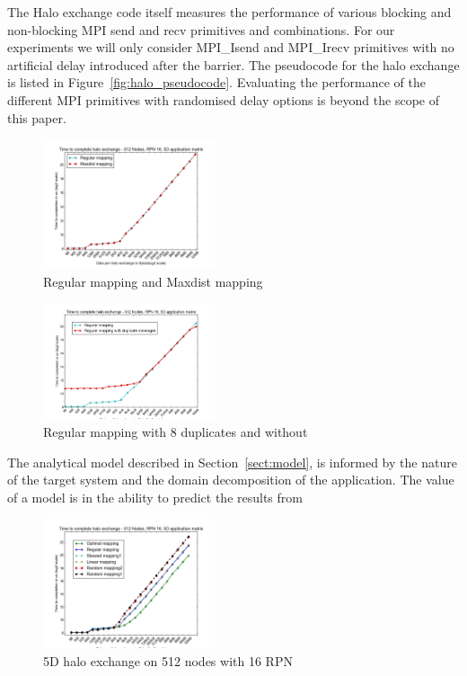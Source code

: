 \documentclass{acm_proc_article-sp}
\begin{document}
The Halo exchange code itself measures the performance of various blocking and non-blocking MPI send and recv primitives and combinations.
For our experiments we will only consider MPI\_Isend and MPI\_Irecv primitives with no artificial delay introduced after the barrier.
The pseudocode for the halo exchange is listed in Figure~\ref{fig:halo_pseudocode}.
Evaluating the performance of the different MPI primitives with randomised delay options is beyond the scope of this paper.


\begin{figure}
  \center
  \includegraphics[width=0.45\textwidth]{regular_vs_maxdist.png}
  \caption{Regular mapping and Maxdist mapping}
    \label{fig:regular_vs_maxdist}
\end{figure}


\begin{figure}
  \center
  \includegraphics[width=0.45\textwidth]{regular_vs_cache_duplicates.png}
  \caption{Regular mapping with 8 duplicates and without}
    \label{fig:caching_figure_vs_without}
\end{figure}

The analytical model described in Section~\ref{sect:model}, is informed by the nature of the target system
and the domain decomposition of the application. The value of a model is in the ability to predict the
results from
%

\begin{figure}
  \center
  \includegraphics[width=0.45\textwidth]{5D_512_most_mappings_2.png}
  \caption{5D halo exchange on 512 nodes with 16 RPN}
    \label{fig:5D halo exchange on 512 nodes with 16 RPN}
\end{figure}
\end{document}
